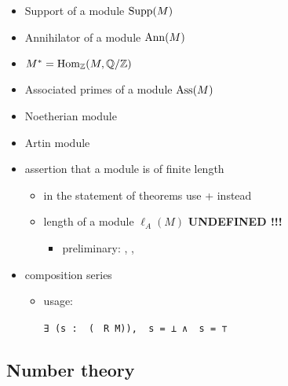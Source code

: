 \begin{itemize}
\item
Support of a module ${\mathrm{Supp}}(M)$ 
\item
Annihilator of a module ${\mathrm{Ann}}(M)$ 
\item
$M^*=\operatorname{Hom}_{\mathbb {Z}}(M,{\mathbb {Q}}/{\mathbb {Z}})$ 
\item
Associated primes of a module $\operatorname{Ass}(M)$ 
\item
Noetherian module 
\item
Artin module 
\item
assertion that a module is of finite length 
\begin{itemize}
\item
in the statement of theorems use  +  instead
\item
length of a module $\ell_A(M)$ \textbf{UNDEFINED !!!}
\begin{itemize}
\item
preliminary: , , 
\end{itemize}
\end{itemize}
\item
composition series 
\begin{itemize}
\item
usage:

\verb|∃ (s : |\verb| (|%
\verb| R M)), |\verb| s = ⊥ ∧ |\verb| s = ⊤|
\end{itemize}
\end{itemize}

\subsection{Number theory}

